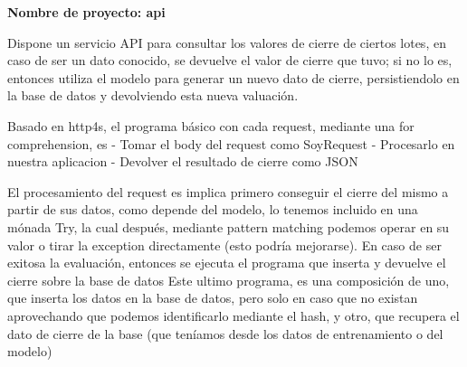 \documentclass[10pt,spanish,a4paper,]{article}
\begin{document}
\textbf{Nombre de proyecto: api}

Dispone un servicio API para consultar los valores de cierre de ciertos
lotes, en caso de ser un dato conocido, se devuelve el valor de cierre
que tuvo; si no lo es, entonces utiliza el modelo para generar un nuevo
dato de cierre, persistiendolo en la base de datos y devolviendo esta
nueva valuación.

Basado en http4s, el programa básico con cada request, mediante una for
comprehension, es - Tomar el body del request como SoyRequest -
Procesarlo en nuestra aplicacion - Devolver el resultado de cierre como
JSON

El procesamiento del request es implica primero conseguir el cierre del
mismo a partir de sus datos, como depende del modelo, lo tenemos
incluido en una mónada Try, la cual después, mediante pattern matching
podemos operar en su valor o tirar la exception directamente (esto
podría mejorarse). En caso de ser exitosa la evaluación, entonces se
ejecuta el programa que inserta y devuelve el cierre sobre la base de
datos Este ultimo programa, es una composición de uno, que inserta los
datos en la base de datos, pero solo en caso que no existan aprovechando
que podemos identificarlo mediante el hash, y otro, que recupera el dato
de cierre de la base (que teníamos desde los datos de entrenamiento o
del modelo)
\end{document}
